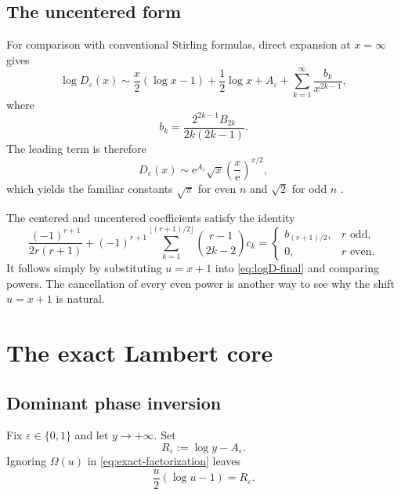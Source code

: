 \documentclass[11pt,a4paper,oneside]{book}
\newcommand{\e}{\mathrm e}
\newcommand{\eps}{\varepsilon}
\begin{document}
\section{The uncentered form}

For comparison with conventional Stirling formulas, direct expansion at
\(x=\infty\) gives
\begin{equation}\label{eq:uncentered-log}
 \log D_\eps(x)
 \sim
 \frac{x}{2}(\log x-1)+\frac12\log x+A_\eps
 +\sum_{k=1}^\infty
 \frac{b_k}{x^{2k-1}},
\end{equation}
where
\begin{equation}\label{eq:bk}
 b_k=\frac{2^{2k-1}B_{2k}}{2k(2k-1)}.
\end{equation}
The leading term is therefore
\[
 D_\eps(x)
 \sim \e^{A_\eps}\sqrt{x}\left(\frac{x}{\e}\right)^{x/2},
\]
which yields the familiar constants \(\sqrt\pi\) for even \(n\) and
\(\sqrt2\) for odd \(n\) \cite{OEIS-A006882}.

The centered and uncentered coefficients satisfy the identity
\begin{equation}\label{eq:center-shift-identity}
 \frac{(-1)^{r+1}}{2r(r+1)}
 +(-1)^{r+1}
 \sum_{k=1}^{\lfloor(r+1)/2\rfloor}
 \binom{r-1}{2k-2}c_k
 =
 \begin{cases}
  b_{(r+1)/2},&r\text{ odd},\\
  0,&r\text{ even}.
 \end{cases}
\end{equation}
It follows simply by substituting \(u=x+1\) into
\cref{eq:logD-final} and comparing powers.  The cancellation of every even
power is another way to see why the shift \(u=x+1\) is natural.

\chapter{The exact Lambert core}

\section{Dominant phase inversion}

Fix \(\eps\in\{0,1\}\) and let \(y\to+\infty\).  Set
\begin{equation}\label{eq:R-eps}
 R_\eps:=\log y-A_\eps.
\end{equation}
Ignoring \(\Omega(u)\) in \cref{eq:exact-factorization} leaves
\begin{equation}\label{eq:core-equation}
 \frac{u}{2}(\log u-1)=R_\eps.
\end{equation}
\end{document}
